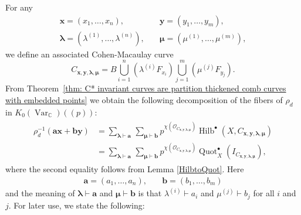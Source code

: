 \documentclass[12pt]{amsart}
\theoremstyle{definition}
\newcommand{\CC} {\mathbb{C}}          %
\renewcommand{\O}{\mathcal{O}}
\newcommand{\Hilb}{\operatorname{Hilb}}
\newcommand{\Quot}{\operatorname{Quot}}
\newcommand{\Var}{\operatorname{Var}}
\newcommand{\boldx}{\boldsymbol{x}}
\newcommand{\boldy}{\boldsymbol{y}}
\newcommand{\bolda}{\boldsymbol{a}}
\newcommand{\boldb}{\boldsymbol{b}}
\newcommand{\boldlambda}{\boldsymbol{\lambda }}
\newcommand{\boldmu}{\boldsymbol{\mu }}
\begin{document}
For any
\begin{align*}
\boldx =(x_{1},\dotsc ,x_{n}),&\quad \boldy =(y_{1},\dotsc
,y_{m}),\\
\boldlambda =(\lambda^{(1)},\dotsc ,\lambda^{(n)}),&\quad \boldmu =(\mu^{(1)},\dotsc ,\mu^{(m)}),
\end{align*}
we define an associated Cohen-Macaulay curve
\[
C_{\boldx, \boldy, \boldlambda, \boldmu} = B \bigcup_{i=1}^{n}\left(\lambda^{(i)}F_{x_{i}} \right)
\bigcup_{j=1}^{m}\left(\mu^{(j)}F_{y_{j}} \right).
\]
From Theorem~\ref{thm: C* invariant curves are
partition thickened comb curves with embedded points} we obtain the
following decomposition of the fibers of $\rho_{d}$ in $K_0(\Var_{\CC})(\!(p)\!)$:
\begin{align} 
\begin{split} \label{eqn: components of fibers of rho}
\rho_{d}^{-1}(\bolda \boldx +\boldb \boldy ) &=  \sum_{\boldlambda
\vdash \bolda}\, \sum_{\boldmu \vdash \boldb}  p^{\chi(\O_{C_{\boldx, \boldy, \boldlambda, \boldmu}})} \Hilb^{\bullet}(X,C_{\boldx, \boldy, \boldlambda, \boldmu}) \\
&=  \sum_{\boldlambda
\vdash \bolda}\, \sum_{\boldmu \vdash \boldb}  p^{\chi(\O_{C_{\boldx, \boldy, \boldlambda, \boldmu}})} \Quot_X^{\bullet}(I_{C_{\boldx, \boldy, \boldlambda, \boldmu}}),
\end{split}
\end{align}
where the second equality follows from Lemma \ref{HilbtoQuot}. Here 
\begin{align*}
\bolda =(a_{1},\dotsc ,a_{n}),&\quad \boldb =(b_{1},\dotsc
,b_{m})
\end{align*}
and the meaning of $\boldlambda \vdash \bolda$ and $\boldmu \vdash
\boldb$ is that $\lambda^{(i)}\vdash a_{i}$ and $\mu^{(j)}\vdash
b_{j}$ for all $i$ and $j$. For later use, we state the following:
\end{document}
